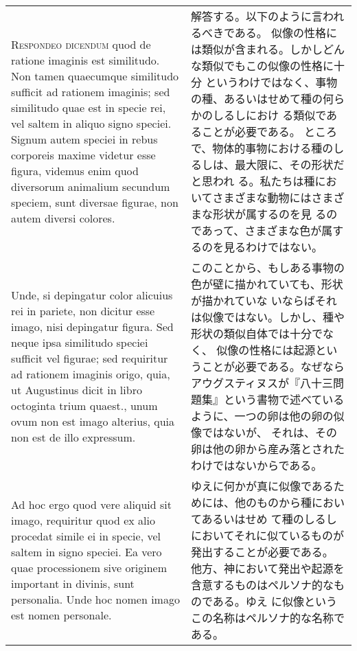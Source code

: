 \documentclass[10pt]{jsarticle} %
\begin{document}
\begin{longtable}{p{21em}p{21em}}
\\



{\scshape Respondeo dicendum} quod de ratione imaginis est similitudo. Non tamen
quaecumque similitudo sufficit ad rationem imaginis; sed similitudo
quae est in specie rei, vel saltem in aliquo signo speciei. Signum
autem speciei in rebus corporeis maxime videtur esse figura, videmus
enim quod diversorum animalium secundum speciem, sunt diversae
figurae, non autem diversi colores. 


&

解答する。以下のように言われるべきである。
似像の性格には類似が含まれる。しかしどんな類似でもこの似像の性格に十分
 というわけではなく、事物の種、あるいはせめて種の何らかのしるしにおけ
 る類似であることが必要である。
ところで、物体的事物における種のしるしは、最大限に、その形状だと思われ
 る。私たちは種においてさまざまな動物にはさまざまな形状が属するのを見
 るのであって、さまざまな色が属するのを見るわけではない。

\\


Unde, si depingatur color alicuius
rei in pariete, non dicitur esse imago, nisi depingatur figura. Sed
neque ipsa similitudo speciei sufficit vel figurae; sed requiritur ad
rationem imaginis origo, quia, ut Augustinus dicit in libro octoginta
trium quaest., unum ovum non est imago alterius, quia non est de illo
expressum. 

&

このことから、もしある事物の色が壁に描かれていても、形状が描かれていな
 いならばそれは似像ではない。しかし、種や形状の類似自体では十分でなく、
 似像の性格には起源ということが必要である。なぜならアウグスティヌスが『八十三問
 題集』という書物で述べているように、一つの卵は他の卵の似像ではないが、
 それは、その卵は他の卵から産み落とされたわけではないからである。


\\



Ad hoc ergo quod vere aliquid sit imago, requiritur quod ex
alio procedat simile ei in specie, vel saltem in signo speciei. Ea
vero quae processionem sive originem important in divinis, sunt
personalia. Unde hoc nomen imago est nomen personale.

&

ゆえに何かが真に似像であるためには、他のものから種においてあるいはせめ
 て種のしるしにおいてそれに似ているものが発出することが必要である。
他方、神において発出や起源を含意するものはペルソナ的なものである。ゆえ
 に似像というこの名称はペルソナ的な名称である。


\end{longtable}
\end{document}
